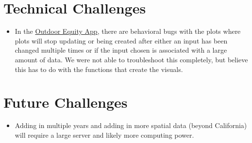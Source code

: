 \documentclass[
  11 pt,
  openany]{book}
\providecommand{\tightlist}{%
  \setlength{\itemsep}{0pt}\setlength{\parskip}{0pt}}
\begin{document}
\hypertarget{technical-challenges}{%
\section{Technical Challenges}\label{technical-challenges}}

\begin{itemize}
\tightlist
\item
  In the \href{https://shinyapps.bren.ucsb.edu/oe_app/}{Outdoor Equity App}, there are behavioral bugs with the plots where plots will stop updating or being created after either an input has been changed multiple times or if the input chosen is associated with a large amount of data. We were not able to troubleshoot this completely, but believe this has to do with the functions that create the visuals.
\end{itemize}

\hypertarget{future-challenges}{%
\section{Future Challenges}\label{future-challenges}}

\begin{itemize}
\tightlist
\item
  Adding in multiple years and adding in more spatial data (beyond California) will require a large server and likely more computing power.
\end{itemize}

  
\end{document}
